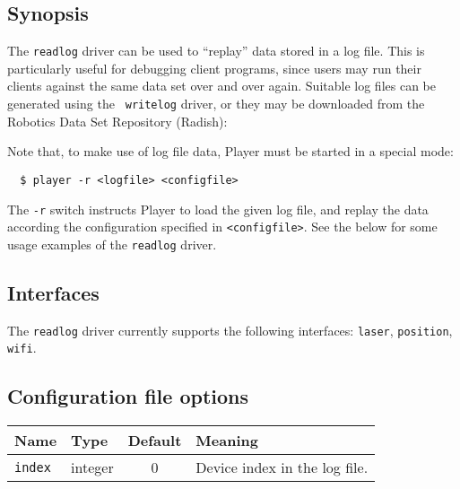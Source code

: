 
\subsection*{Synopsis}

The {\tt readlog} driver can be used to ``replay'' data stored in a
log file.  This is particularly useful for debugging client programs,
since users may run their clients against the same data set over and
over again.  Suitable log files can be generated using the {\tt
writelog} driver, or they may be downloaded from the Robotics Data Set
Repository (Radish):
  \begin{quote} 
  \RADISHHOMEPAGE 
  \end{quote}
Note that, to make use of log file data, Player must be started in a
special mode:
  \begin{verbatim}
  $ player -r <logfile> <configfile>
  \end{verbatim} %
The {\tt -r} switch instructs Player to load the given log file, and
replay the data according the configuration specified in
\verb+<configfile>+.  See the below for some usage examples of the 
{\tt readlog} driver.



\subsection*{Interfaces}

The {\tt readlog} driver currently supports the following interfaces:
{\tt laser}, {\tt position}, {\tt wifi}.


\subsection*{Configuration file options}

\begin{center}
{\small \begin{tabularx}{\columnwidth}{|l|l|c|X|}
\hline
Name & Type & Default & Meaning\\
\hline
{\tt index} & integer & 0 & Device index in the log file. \\
\hline
\end{tabularx}}
\end{center}




